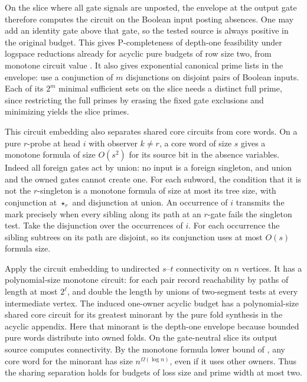 On the slice where all gate signals are
unposted, the envelope at the output gate
therefore computes the circuit on the
Boolean input posting absences. One may
add an identity gate above that gate, so
the tested source is always positive in
the original budget. This gives
$\mathrm P$-completeness of depth-one
feasibility under logspace reductions
already for acyclic pure budgets of row
size two, from monotone circuit value
\cite{Goldschlager1977}. It also gives
exponential canonical prime lists in
the envelope: use a conjunction of $m$
disjunctions on disjoint pairs of Boolean
inputs. Each of its $2^m$ minimal sufficient
sets on the slice needs a distinct full
prime, since restricting the full primes
by erasing the fixed gate exclusions and
minimizing yields the slice primes.

This circuit embedding also separates shared core
circuits from core words. On a pure $r$-probe at
head $i$ with observer $k\ne r$, a core word of
size $s$ gives a monotone formula of size $O(s^2)$
for its source bit in the absence variables.
Indeed all foreign gates act by union: no input
is a foreign singleton, and union and the owned
gates cannot create one. For each subword, the
condition that it is not the $r$-singleton is
a monotone formula of size at most its tree size,
with conjunction at $\star_r$ and disjunction
at union. An occurrence of $i$ transmits the
mark precisely when every sibling along its
path at an $r$-gate fails the singleton test.
Take the disjunction over the occurrences of
$i$. For each occurrence the sibling subtrees
on its path are disjoint, so its conjunction
uses at most $O(s)$ formula size.

Apply the circuit embedding to undirected
$s$--$t$ connectivity on $n$ vertices. It has
a polynomial-size monotone circuit: for each
pair record reachability by paths of length
at most $2^\ell$, and double the length by
unions of two-segment tests at every
intermediate vertex. The induced one-owner
acyclic budget has a polynomial-size shared
core circuit for its greatest minorant
by the pure fold synthesis in the acyclic
appendix. Here that minorant is the
depth-one envelope because bounded pure
words distribute into owned folds.
On the gate-neutral slice its output
source computes connectivity. By the
monotone formula lower bound of
\cite[Corollary~4.2]{KarchmerWigderson1990},
any core word for the minorant has size
$n^{\Omega(\log n)}$, even if it uses
other owners. Thus the sharing separation
holds for budgets of loss size and prime
width at most two.

